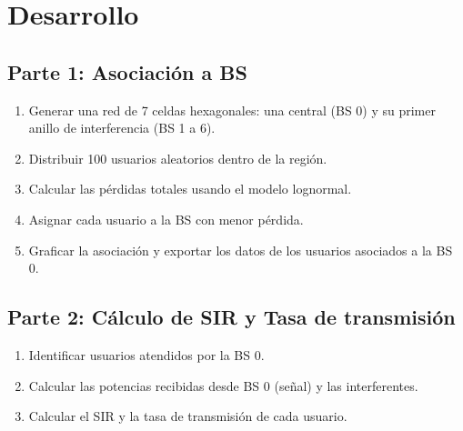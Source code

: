 \section{\Large Desarrollo}

\subsection*{Parte 1: Asociación a BS}
\begin{enumerate}
    \item Generar una red de 7 celdas hexagonales: una central (BS 0) y su primer anillo de interferencia (BS 1 a 6).
    \item Distribuir 100 usuarios aleatorios dentro de la región.
    \item Calcular las pérdidas totales usando el modelo lognormal.
    \item Asignar cada usuario a la BS con menor pérdida.
    \item Graficar la asociación y exportar los datos de los usuarios asociados a la BS 0.
\end{enumerate}

\subsection*{Parte 2: Cálculo de SIR y Tasa de transmisión}
\begin{enumerate}
    \item Identificar usuarios atendidos por la BS 0.
    \item Calcular las potencias recibidas desde BS 0 (señal) y las interferentes.
    \item Calcular el SIR y la tasa de transmisión de cada usuario.
\end{enumerate}
